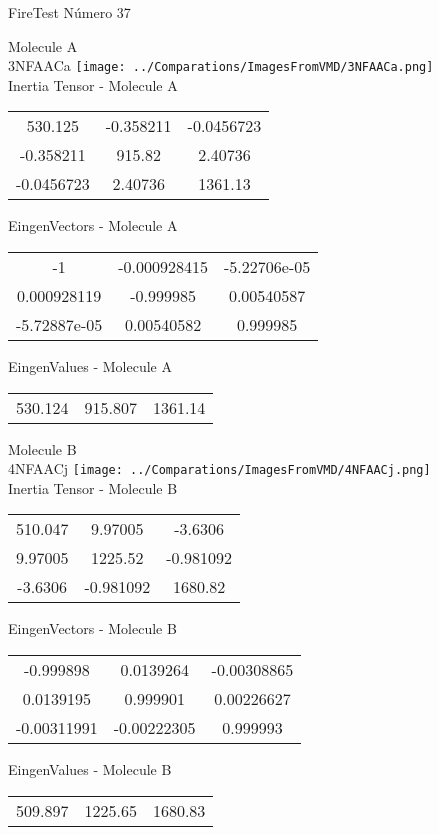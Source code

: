 \vtab[-2cm]
\begin{center}
{\large FireTest \tab Número 37}
\end{center}
\begin{multicols}{2}
\begin{center}

Molecule A \\ 
3NFAACa
\texttt{[image: ../Comparations/ImagesFromVMD/3NFAACa.png]}
\\
Inertia Tensor - Molecule A \\
\vtab

\begin{tabular}{|c c c|}
530.125	 & 	-0.358211	 & 	-0.0456723	 \\
-0.358211	 & 	915.82	 & 	2.40736	 \\
-0.0456723	 & 	2.40736	 & 	1361.13
\end{tabular}

\vtab
 EingenVectors - Molecule A     \\
\vtab
\begin{tabular}{|c c c|}
-1	 & 	-0.000928415	 & 	-5.22706e-05	 \\
0.000928119	 & 	-0.999985	 & 	0.00540587	 \\
-5.72887e-05	 & 	0.00540582	 & 	0.999985
\end{tabular}

\vtab
 EingenValues - Molecule A     \\
\vtab
\begin{tabular}{|c c c|}
530.124	 & 	915.807	 & 	1361.14	 \\
\end{tabular}
\columnbreak

Molecule B \\ 
4NFAACj
\texttt{[image: ../Comparations/ImagesFromVMD/4NFAACj.png]}
\\
Inertia Tensor - Molecule B \\
\vtab

\begin{tabular}{|c c c|}
510.047	 & 	9.97005	 & 	-3.6306	 \\
9.97005	 & 	1225.52	 & 	-0.981092	 \\
-3.6306	 & 	-0.981092	 & 	1680.82
\end{tabular}

\vtab
 EingenVectors - Molecule B     \\
\vtab
\begin{tabular}{|c c c|}
-0.999898	 & 	0.0139264	 & 	-0.00308865	 \\
0.0139195	 & 	0.999901	 & 	0.00226627	 \\
-0.00311991	 & 	-0.00222305	 & 	0.999993
\end{tabular}

\vtab
 EingenValues - Molecule B     \\
\vtab
\begin{tabular}{|c c c|}
509.897	 & 	1225.65	 & 	1680.83	 \\
\end{tabular}

\end{center}
\end{multicols}
